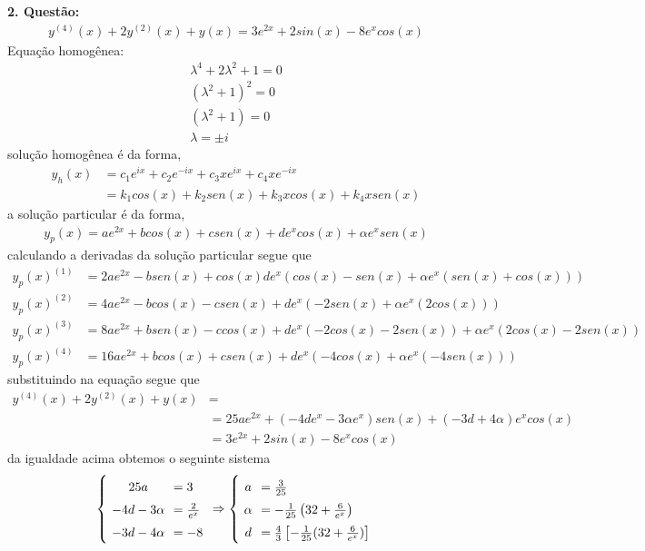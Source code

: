 \documentclass[a4paper,12pt]{article}
\begin{document}
\textbf{2. Quest\~ao:}
\begin{align*}
	y^{(4)}(x) + 2y^{(2)}(x) + y(x) = 3e^{2x} + 2sin(x) - 8e^{x}cos(x)
\end{align*}
Equa\c c\~ao homog\^enea:\\
\begin{align*}
{\lambda}^{4} + 2 {\lambda}^{2} + 1 = 0\\
({\lambda}^{2} + 1)^{2} = 0\\
({\lambda}^{2} + 1) = 0\\
{\lambda} = \pm i
\end{align*}
solu\c c\~ao homog\^enea \'e da forma,
\begin{align*}
	y_h(x) &= c_1e^{ix} + c_2e^{-ix} + c_3xe^{ix} + c_4xe^{-ix} \\
	&=  k_1cos(x) + k_2sen(x) + k_3xcos(x) + k_4xsen(x)
\end{align*}
a solu\c c\~ao particular \'e da forma, 
\begin{align*}
	y_p(x) = ae^{2x} + bcos(x) + csen(x) + de^{x}cos(x) + {\alpha} e^{x} sen(x)
\end{align*}
calculando a derivadas da solu\c c\~ao particular segue que
\begin{align*}
	{y_p(x)}^{(1)} &= 2ae^{2x} -b sen(x) + cos(x) de^{x}(cos(x) -sen(x) + {\alpha}e^{x} (sen(x) + cos(x))) \\
	{y_p(x)}^{(2)} &= 4ae^{2x} -bcos(x) -csen(x) + de^{x}(-2sen(x)+ {\alpha}e^{x}(2cos(x)))\\
	{y_p(x)}^{(3)} &= 8ae^{2x} + bsen(x) -ccos(x) + de^{x}(-2cos(x) -2sen(x)) + {\alpha}e^{x}(2cos(x) -2sen(x)) \\
	{y_p(x)}^{(4)} &= 16ae^{2x} + bcos(x) + csen(x) + de^{x}(-4cos(x)+ {\alpha}e^{x}(-4sen(x)))
\end{align*}
substituindo na equa\c c\~ao segue que 
\begin{align*}
	y^{(4)}(x) + 2y^{(2)}(x) + y(x) &= \\ 
	&= 25ae^{2x} + (-4de^{x} -3{\alpha}e^{x})sen(x) + (-3d + 4{\alpha})e^{x}cos(x)\\
	&= 3e^{2x} + 2sin(x) - 8e^{x}cos(x)
\end{align*}
da igualdade acima obtemos o seguinte sistema 
\begin{align*}
	\left \{ 
{\arraycolsep=3.4pt\def\arraystretch{1.5}
		\begin{array}{cl}	
			25a &= 3 \\
			-4d -3{\alpha} &= \frac{2}{e^{x}} \\
			-3d -4{\alpha} &= -8	
		\end{array}
	}
		\right . \Rightarrow  
		\left \{ 
{\arraycolsep=3.4pt\def\arraystretch{1.5}
		\begin{array}{cl}	
			a &= \frac{3}{25} \\
			{\alpha} &= -\frac{1}{25}\left ( 32 + \frac{6}{e^{x}}\right )  \\
			d &= \frac{4}{3}\left [ -\frac{1}{25}(32 + \frac{6}{e^{x}})\right ] 	
		\end{array}
	}
		\right .
\end{align*}
\end{document}
